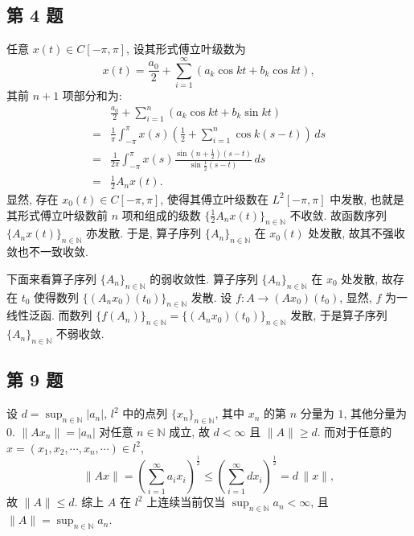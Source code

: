 \documentclass[../main.tex]{subfiles}
\begin{document}
\subsection{第 4 题}
任意 $x(t) \in C[-\pi, \pi]$, 设其形式傅立叶级数为
\[
    x(t) = \frac{a_0}{2} + \sum_{i = 1}^{\infty}(a_k \cos{kt} + b_k \cos{kt}),
\]
其前 $n + 1$ 项部分和为:
\begin{align*}
     & \frac{a_0}{2} + \sum_{i = 1}^{n}(a_k \cos kt + b_k \sin kt) \\
    =& \frac{1}{\pi} \int_{-\pi}^{\pi} x(s)(\frac{1}{2} + \sum_{i = 1}^{n} \cos k(s - t)) \, ds \\
    =& \frac{1}{2 \pi} \int_{-\pi}^{\pi} x(s) \frac{\sin (n + \frac{1}{2})(s - t)}{\sin \frac{1}{2}(s - t)} \, ds \\
    =& \frac{1}{2} A_n x(t).
\end{align*}
显然, 存在 $x_0(t) \in C[-\pi, \pi]$,
使得其傅立叶级数在 $L^2 [-\pi, \pi]$ 中发散,
也就是其形式傅立叶级数前 $n$ 项和组成的级数 $\{ \frac{1}{2} A_n x(t) \}_{n \in \mathbb{N}}$ 不收敛.
故函数序列 $\{ A_n x(t) \}_{n \in \mathbb{N}}$ 亦发散.
于是, 算子序列 $\{ A_n \}_{n \in \mathbb{N}}$ 在 $x_0(t)$ 处发散,
故其不强收敛也不一致收敛.

下面来看算子序列 $\{ A_n \}_{n \in \mathbb{N}}$ 的弱收敛性.
算子序列 $\{ A_n \}_{n \in \mathbb{N}}$ 在 $x_0$ 处发散,
故存在 $t_0$ 使得数列 $\{ (A_n x_0)(t_0) \}_{n \in \mathbb{N}}$ 发散.
设 $f: A \to (A x_0)(t_0)$, 显然, $f$ 为一线性泛函.
而数列 $\{ f(A_n) \}_{n \in \mathbb{N}} = \{ (A_n x_0)(t_0) \}_{n \in \mathbb{N}}$ 发散,
于是算子序列 $\{ A_n \}_{n \in \mathbb{N}}$ 不弱收敛.

\subsection{第 9 题}
设 $d = \sup_{n \in \mathbb{N}} | a_n |$,
$l^2$ 中的点列 $\{ x_n \}_{n \in \mathbb{N}}$, 其中 $x_n$ 的第 $n$ 分量为 $1$, 其他分量为 $0$.
$\| A x_n \| = | a_n |$ 对任意 $n \in \mathbb{N}$ 成立,
故 $d < \infty$ 且 $\| A \| \geqslant d$.
而对于任意的 $x = (x_1, x_2, \cdots, x_n, \cdots)\in l^2$,
\[
    \| A x \| = \left( \sum_{i = 1}^{\infty} a_i x_i \right)^{\frac{1}{2}}
    \leqslant \left( \sum_{i = 1}^{\infty} d x_i \right)^{\frac{1}{2}}
    = d \, \| x \|,
\]
故 $\| A \| \leqslant d$.
综上 $A$ 在 $l^2$ 上连续当前仅当 $\sup_{n \in \mathbb{N}} a_n < \infty$,
且 $\| A \| = \sup_{n \in \mathbb{N}} a_n$.
\end{document}
